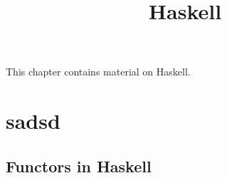 

%



\title{Haskell}

\maketitle

\label{section-phantom}

This chapter contains material on Haskell.

\ChapterTableOfContents

\section{sadsd}\label{section-sadsd}
\subsection{Functors in Haskell}\label{section-functors-in-haskell}
\begin{appendices}

\end{appendices}

